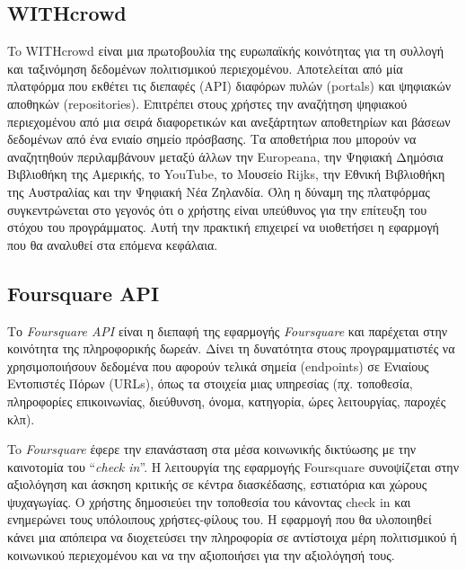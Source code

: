 \subsection{WITHcrowd}
To WITHcrowd \cite{[WIT+18]} είναι μια πρωτοβουλία της ευρωπαϊκής κοινότητας για τη συλλογή και ταξινόμηση δεδομένων πολιτισμικού περιεχομένου. Αποτελείται από μία πλατφόρμα που εκθέτει τις διεπαφές (ΑΡΙ) διαφόρων πυλών (portals) και ψηφιακών αποθηκών (repositories). Eπιτρέπει στους χρήστες την αναζήτηση ψηφιακού περιεχομένου από μια σειρά διαφορετικών και ανεξάρτητων αποθετηρίων και βάσεων δεδομένων από ένα ενιαίο σημείο πρόσβασης. Τα αποθετήρια που μπορούν να αναζητηθούν περιλαμβάνουν μεταξύ άλλων την Europeana, την Ψηφιακή Δημόσια Βιβλιοθήκη της Αμερικής, το YouTube, το Μουσείο Rijks, την Εθνική Βιβλιοθήκη της Αυστραλίας και την Ψηφιακή Νέα Ζηλανδία. Όλη η δύναμη της πλατφόρμας συγκεντρώνεται στο γεγονός ότι ο χρήστης είναι υπεύθυνος για την επίτευξη του στόχου του προγράμματος. Αυτή την πρακτική επιχειρεί να υιοθετήσει η εφαρμογή που θα αναλυθεί στα επόμενα κεφάλαια. 

\subsection{Foursquare API}
Το \textit{Foursquare API} \cite{[4SQ+18]} είναι η διεπαφή της εφαρμογής \textit{Foursquare} και παρέχεται στην κοινότητα της πληροφορικής δωρεάν. Δίνει τη δυνατότητα στους προγραμματιστές να χρησιμοποιήσουν δεδομένα που αφορούν τελικά σημεία (endpoints) σε Ενιαίους Εντοπιστές Πόρων (URLs), όπως τα στοιχεία μιας υπηρεσίας (πχ. τοποθεσία, πληροφορίες επικοινωνίας, διεύθυνση, όνομα, κατηγορία, ώρες λειτουργίας, παροχές κλπ).

To \textit{Foursquare} έφερε την επανάσταση στα μέσα κοινωνικής δικτύωσης με την καινοτομία του ``\textit{check in}''.  Η λειτουργία της εφαρμογής Foursquare συνοψίζεται στην αξιολόγηση και άσκηση κριτικής σε κέντρα διασκέδασης, εστιατόρια και χώρους ψυχαγωγίας. Ο χρήστης δημοσιεύει την τοποθεσία του κάνοντας check in και ενημερώνει τους υπόλοιπους χρήστες-φίλους του. Η εφαρμογή που θα υλοποιηθεί κάνει μια απόπειρα να διοχετεύσει την πληροφορία σε αντίστοιχα μέρη πολιτισμικού ή κοινωνικού περιεχομένου και να την αξιοποιήσει για την αξιολόγησή τους.


